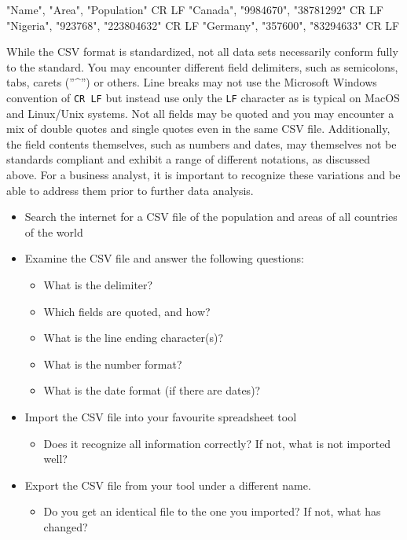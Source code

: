 \begin{textcode}
"Name", "Area", "Population" CR LF
"Canada", "9984670", "38781292" CR LF
"Nigeria", "923768", "223804632" CR LF
"Germany", "357600", "83294633" CR LF
\end{textcode}

While the CSV format is standardized, not all data sets necessarily conform fully to the standard. You may encounter different field delimiters, such as semicolons, tabs, carets (''\^{}'') or others. Line breaks may not use the Microsoft Windows convention of \texttt{CR LF} but instead use only the \texttt{LF} character as is typical on MacOS and Linux/Unix systems. Not all fields may be quoted and you may encounter a mix of double quotes and single quotes even in the same CSV file. Additionally, the field contents themselves, such as numbers and dates, may themselves not be standards compliant and exhibit a range of different notations, as discussed above. For a business analyst, it is important to recognize these variations and be able to address them prior to further data analysis.

\begin{exerciseboxcomputer}

\begin{itemize}
	\item Search the internet for a CSV file of the population and areas of all countries of the world
	\item Examine the CSV file and answer the following questions:
	\begin{itemize}
		\item What is the delimiter?
		\item Which fields are quoted, and how?
		\item What is the line ending character(s)?
		\item What is the number format?
		\item What is the date format (if there are dates)?
	\end{itemize}
	\item Import the CSV file into your favourite spreadsheet tool
	\begin{itemize}
		\item Does it recognize all information correctly? If not, what is not imported well?
	\end{itemize}
	\item Export the CSV file from your tool under a different name.
	\begin{itemize}
		\item Do you get an identical file to the one you imported? If not, what has changed?
	\end{itemize}
\end{itemize}
\end{exerciseboxcomputer}

